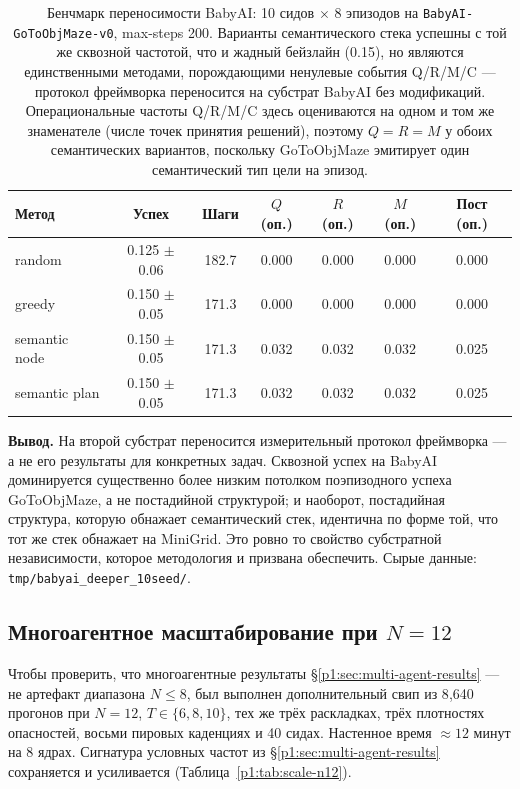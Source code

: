\documentclass{article}
\begin{document}
\begin{table}[h]
\centering
\caption{Бенчмарк переносимости BabyAI: 10 сидов $\times$ 8 эпизодов на \texttt{BabyAI-GoToObjMaze-v0}, max-steps 200. Варианты семантического стека успешны с той же сквозной частотой, что и жадный бейзлайн (0.15), но являются единственными методами, порождающими ненулевые события Q/R/M/C --- протокол фреймворка переносится на субстрат BabyAI без модификаций. Операциональные частоты Q/R/M/C здесь оцениваются на одном и том же знаменателе (числе точек принятия решений), поэтому $Q{=}R{=}M$ у обоих семантических вариантов, поскольку GoToObjMaze эмитирует один семантический тип цели на эпизод.}
\label{p1:tab:babyai-deeper}
\small
\begin{tabular}{l c c c c c c}
\toprule
Метод & Успех & Шаги & $Q$ (оп.) & $R$ (оп.) & $M$ (оп.) & Пост (оп.) \\
\midrule
random         & 0.125 $\pm$ 0.06 & 182.7 & 0.000 & 0.000 & 0.000 & 0.000 \\
greedy         & 0.150 $\pm$ 0.05 & 171.3 & 0.000 & 0.000 & 0.000 & 0.000 \\
semantic node  & 0.150 $\pm$ 0.05 & 171.3 & 0.032 & 0.032 & 0.032 & 0.025 \\
semantic plan  & 0.150 $\pm$ 0.05 & 171.3 & 0.032 & 0.032 & 0.032 & 0.025 \\
\bottomrule
\end{tabular}
\end{table}

\textbf{Вывод.} На второй субстрат переносится измерительный протокол фреймворка --- а не его результаты для конкретных задач. Сквозной успех на BabyAI доминируется существенно более низким потолком поэпизодного успеха GoToObjMaze, а не постадийной структурой; и наоборот, постадийная структура, которую обнажает семантический стек, идентична по форме той, что тот же стек обнажает на MiniGrid. Это ровно то свойство субстратной независимости, которое методология и призвана обеспечить. Сырые данные: \texttt{tmp/babyai\_deeper\_10seed/}.

\subsection{Многоагентное масштабирование при $N=12$}
\label{p1:app:scale-N12}

Чтобы проверить, что многоагентные результаты \S\ref{p1:sec:multi-agent-results} --- не артефакт диапазона $N\!\le\!8$, был выполнен дополнительный свип из 8{,}640 прогонов при $N\!=\!12$, $T \in \{6, 8, 10\}$, тех же трёх раскладках, трёх плотностях опасностей, восьми пировых каденциях и 40 сидах. Настенное время $\approx 12$ минут на 8 ядрах. Сигнатура условных частот из \S\ref{p1:sec:multi-agent-results} сохраняется и усиливается (Таблица~\ref{p1:tab:scale-n12}).
\end{document}
